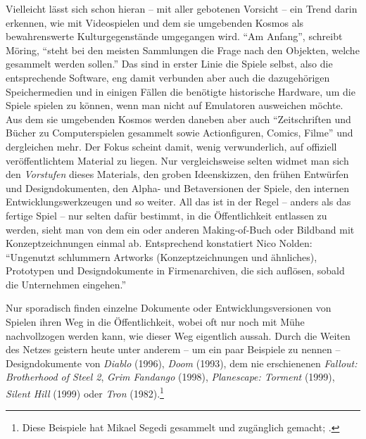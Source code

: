 \documentclass[a5paper,pagesize,numbers=noenddot]{scrbook}
\begin{document}
Vielleicht lässt sich schon hieran -- mit aller gebotenen Vorsicht -- ein Trend darin erkennen, wie mit Videospielen und dem sie umgebenden Kosmos als bewahrenswerte Kulturgegenstände umgegangen wird.
\enquote{Am Anfang}, schreibt Möring, \enquote{steht bei den meisten Sammlungen die Frage nach den Objekten, welche gesammelt werden sollen.}\autocite[S.~121]{moering_kulturarchive_2020}
Das sind in erster Linie die Spiele selbst, also die entsprechende Software, eng damit verbunden aber auch die dazugehörigen Speichermedien und in einigen Fällen die benötigte historische Hardware, um die Spiele spielen zu können, wenn man nicht auf Emulatoren ausweichen möchte.
Aus dem sie umgebenden Kosmos werden daneben aber auch \enquote{Zeitschriften und Bücher zu Computerspielen gesammelt sowie Actionfiguren, Comics, Filme}\autocite[S.~121]{moering_kulturarchive_2020} und dergleichen mehr.
Der Fokus scheint damit, wenig verwunderlich, auf offiziell veröffentlichtem Material zu liegen.
Nur vergleichsweise selten widmet man sich den \textit{Vorstufen} dieses Materials, den groben Ideenskizzen, den frühen Entwürfen und Designdokumenten, den Alpha- und Betaversionen der Spiele, den internen Entwicklungswerkzeugen und so weiter.
All das ist in der Regel -- anders als das fertige Spiel -- nur selten dafür bestimmt, in die Öffentlichkeit entlassen zu werden, sieht man von dem ein oder anderen Making-of-Buch oder Bildband mit Konzeptzeichnungen einmal ab.
Entsprechend konstatiert Nico Nolden:
\enquote{Ungenutzt schlummern Artworks (Konzeptzeichnungen und ähnliches), Prototypen und Designdokumente in Firmenarchiven, die sich auf‌lösen, sobald die Unternehmen eingehen.}\autocite[S.~44]{nolden_geschichte_2020}

Nur sporadisch finden einzelne Dokumente oder Entwicklungsversionen von Spielen ihren Weg in die Öffentlichkeit, wobei oft nur noch mit Mühe nachvollzogen werden kann, wie dieser Weg eigentlich aussah.
Durch die Weiten des Netzes geistern heute unter anderem -- um ein paar Beispiele zu nennen -- Designdokumente von \textit{Diablo} (1996), \textit{Doom} (1993), dem nie erschienenen \textit{Fallout: Brotherhood of Steel 2}, \textit{Grim Fandango} (1998), \textit{Planescape: Torment} (1999), \textit{Silent Hill} (1999) oder \textit{Tron} (1982).\footnote{Diese Beispiele hat Mikael Segedi gesammelt und zugänglich gemacht; \autocite[vgl.][]{segedi_famous_2015}.}
\end{document}
